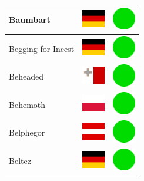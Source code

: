 \documentclass[12pt, a4paper, twoside]{report}
\begin{document}
\begin{center}
\begin{longtable}{|p{5cm}|p{2cm}|p{2cm}|}
 Baumbart                                                   & \includegraphics[width=1cm]{../img/flags/de} &   \includegraphics[width=1cm]{../likes/y} \\ \hline
 Begging for Incest                                         & \includegraphics[width=1cm]{../img/flags/de} &   \includegraphics[width=1cm]{../likes/y} \\ \hline
 Beheaded                                                   & \includegraphics[width=1cm]{../img/flags/mt} &   \includegraphics[width=1cm]{../likes/y} \\ \hline
 Behemoth                                                   & \includegraphics[width=1cm]{../img/flags/pl} &   \includegraphics[width=1cm]{../likes/y} \\ \hline
 Belphegor                                                  & \includegraphics[width=1cm]{../img/flags/at} &   \includegraphics[width=1cm]{../likes/y} \\ \hline
 Beltez                                                     & \includegraphics[width=1cm]{../img/flags/de} &   \includegraphics[width=1cm]{../likes/y} \\ \hline

\end{longtable}
\end{center}
\end{document}
